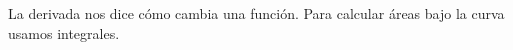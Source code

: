 \documentclass[preview]{standalone}
\begin{document}
\begin{center}
La derivada nos dice cómo cambia una función. Para calcular áreas bajo la curva usamos integrales.
\end{center}
\end{document}
